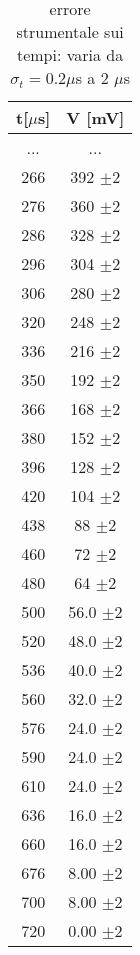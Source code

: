 \documentclass[a4paper]{article}
\theoremstyle{definition}
\begin{document}
\begin{table}[!htbp]
{\begin{minipage}{.5\linewidth}
    	 \caption{ }
            \begin{tabular}{c|c}

        t[\(\mu\)s] & V [mV] \\
        \hline
        \hline
        ... & ...\\
       266& 392 \(\pm 2\)\\
       \hline
       276& 360 \(\pm 2\)\\
       \hline
       286& 328 \(\pm 2\)\\
       \hline
       296& 304 \(\pm 2\)\\
       \hline
       306& 280 \(\pm 2\)\\
       \hline
       320& 248 \(\pm 2\)\\
       \hline
       336& 216 \(\pm 2\)\\
       \hline
       350& 192 \(\pm 2\)\\
       \hline
       366& 168 \(\pm 2\)\\
       \hline
       380& 152 \(\pm 2\)\\
       \hline
       396& 128 \(\pm 2\)\\
       \hline
       420& 104 \(\pm 2\)\\
       \hline
       438& 88 \(\pm 2\)\\
       \hline
       460& 72 \(\pm 2\)\\
       \hline
       480& 64 \(\pm 2\)\\
       \hline
       500& 56.0 \(\pm 2\)\\
       \hline
       520& 48.0 \(\pm 2\)\\
       \hline
       536& 40.0 \(\pm 2\)\\
       \hline
       560& 32.0 \(\pm 2\)\\
       \hline
       576& 24.0 \(\pm 2\)\\
       \hline
       590& 24.0 \(\pm 2\)\\
       \hline
       610& 24.0 \(\pm 2\)\\
       \hline
       636& 16.0 \(\pm 2\)\\
       \hline
       660& 16.0 \(\pm 2\)\\
       \hline
       676& 8.00 \(\pm 2\)\\
       \hline
       700& 8.00 \(\pm 2\)\\
       \hline
       720& 0.00 \(\pm 2\)\\  
        \hline
        \hline
    \end{tabular}
    \end{minipage} 
        }
        \caption{errore strumentale sui tempi: varia da \(\sigma_{t} = 0.2\mu\)s a 2 \(\mu\)s}
        \label{tab_carica_RC}

\end{table}
\end{document}
